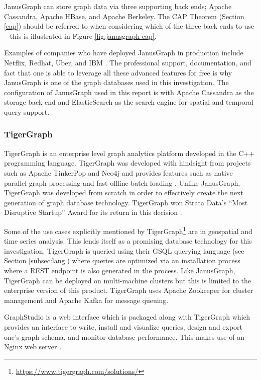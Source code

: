 JanusGraph can store graph data via three supporting back ends; Apache Cassandra, Apache HBase, and Apache Berkeley. The CAP Theorem (Section \ref{cap}) should be referred to when considering which of the three back ends to use -- this is illustrated in Figure \ref{fig:janusgraph-cap}.

Examples of companies who have deployed JanusGraph in production include Netflix, Redhat, Uber, and IBM \cite{janusgraph-readme}. The professional support, documentation, and fact that one is able to leverage all these advanced features for free is why JanusGraph is one of the graph databases used in this investigation. The configuration of JanusGraph used in this report is with Apache Cassandra as the storage back end and ElasticSearch as the search engine for spatial and temporal query support.

\subsubsection{TigerGraph}

TigerGraph is an enterprise level graph analytics platform developed in the C++ programming language. TigerGraph was developed with hindsight from projects such as Apache TinkerPop and Neo4j and provides features such as native parallel graph processing and fast offline batch loading \cite{tigergraph-benchmark} \cite{conference-trip}. Unlike JanusGraph, TigerGraph was developed from scratch in order to effectively create the next generation of graph database technology. TigerGraph won Strata Data’s ``Most Disruptive Startup'' Award for its return in this decision \cite{tigergraph-award}.

Some of the use cases explicitly mentioned by TigerGraph\footnote{\url{https://www.tigergraph.com/solutions/}} are in geospatial and time series analysis. This lends itself as a promising database technology for this investigation. TigerGraph is queried using their GSQL querying language (see Section \ref{subsec:lang}) where queries are optimized via an installation process where a REST endpoint is also generated in the process. Like JanusGraph, TigerGraph can be deployed on multi-machine clusters but this is limited to the enterprise version of this product. TigerGraph uses Apache Zookeeper for cluster management and Apache Kafka for message queuing.

GraphStudio is a web interface which is packaged along with TigerGraph which provides an interface to write, install and visualize queries, design and export one's graph schema, and monitor database performance. This makes use of an Nginx web server \cite{tigergraph-infoworld}.

